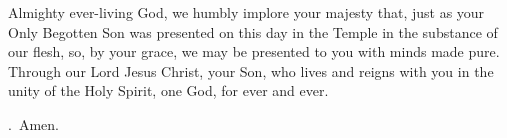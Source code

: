 \lettrine[lines=3]{A}{}lmighty ever-living God,
we humbly implore your majesty
that, just as your Only Begotten Son
was presented on this day in the Temple
in the substance of our flesh,
so, by your grace,
we may be presented to you with minds made pure.
Through our Lord Jesus Christ, your Son,
who lives and reigns with you in the unity of the Holy Spirit,
one God, for ever and ever. \par \Rbar.~Amen.
